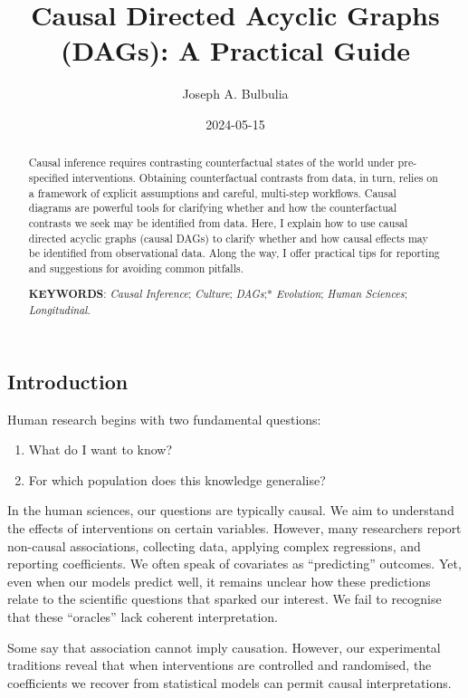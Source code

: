\documentclass[
  single column]{article}
\title{Causal Directed Acyclic Graphs (DAGs): A Practical Guide}
\author{Joseph A. Bulbulia}
\affil{%
             \small{     Victoria University of Wellington, New Zealand
          ORCID \textcolor[HTML]{A6CE39}{\aiOrcid} ~0000-0002-5861-2056 }
              }
\date{2024-05-15}
\providecommand{\tightlist}{%
  \setlength{\itemsep}{0pt}\setlength{\parskip}{0pt}}\usepackage{longtable,booktabs,array}
\begin{document}
\maketitle
\begin{abstract}
Causal inference requires contrasting counterfactual states of the world
under pre-specified interventions. Obtaining counterfactual contrasts
from data, in turn, relies on a framework of explicit assumptions and
careful, multi-step workflows. Causal diagrams are powerful tools for
clarifying whether and how the counterfactual contrasts we seek may be
identified from data. Here, I explain how to use causal directed acyclic
graphs (causal DAGs) to clarify whether and how causal effects may be
identified from observational data. Along the way, I offer practical
tips for reporting and suggestions for avoiding common pitfalls.

\textbf{KEYWORDS}: \emph{Causal Inference}; \emph{Culture};
\emph{DAGs};* \emph{Evolution}; \emph{Human Sciences};
\emph{Longitudinal}.
\end{abstract}

\subsection{Introduction}\label{introduction}

Human research begins with two fundamental questions:

\begin{enumerate}
\def\labelenumi{\arabic{enumi}.}
\tightlist
\item
  What do I want to know?
\item
  For which population does this knowledge generalise?
\end{enumerate}

In the human sciences, our questions are typically causal. We aim to
understand the effects of interventions on certain variables. However,
many researchers report non-causal associations, collecting data,
applying complex regressions, and reporting coefficients. We often speak
of covariates as ``predicting'' outcomes. Yet, even when our models
predict well, it remains unclear how these predictions relate to the
scientific questions that sparked our interest. We fail to recognise
that these ``oracles'' lack coherent interpretation.

Some say that association cannot imply causation. However, our
experimental traditions reveal that when interventions are controlled
and randomised, the coefficients we recover from statistical models can
permit causal interpretations.
\end{document}
